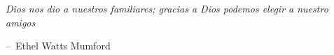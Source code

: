 \documentclass[12pt,letterpaper,titlepage,oneside,openright]{book}
\makeatletter
\newenvironment{chapquote}[2][2em]
  {\setlength{\@tempdima}{#1}%
   \def\chapquote@author{#2}%
   \parshape 1 \@tempdima \dimexpr\textwidth-2\@tempdima\relax%
   \itshape}
  {\par\vspace{.5em}\normalfont\hfill--\ \chapquote@author\hspace*{\@tempdima}\par\bigskip}
\makeatother
\begin{document}
\frontmatter





\tableofcontents
\listoffigures
\listoftables

\newpage

\mainmatter








\newpage

\thispagestyle{lastpage}

\phantom{x}
\vfill
\begin{chapquote}{Ethel Watts Mumford}
\noindent Dios nos dio a nuestros familiares; gracias a Dios podemos elegir a nuestro amigos
\end{chapquote}
\vfill
\phantom{x}
\end{document}
